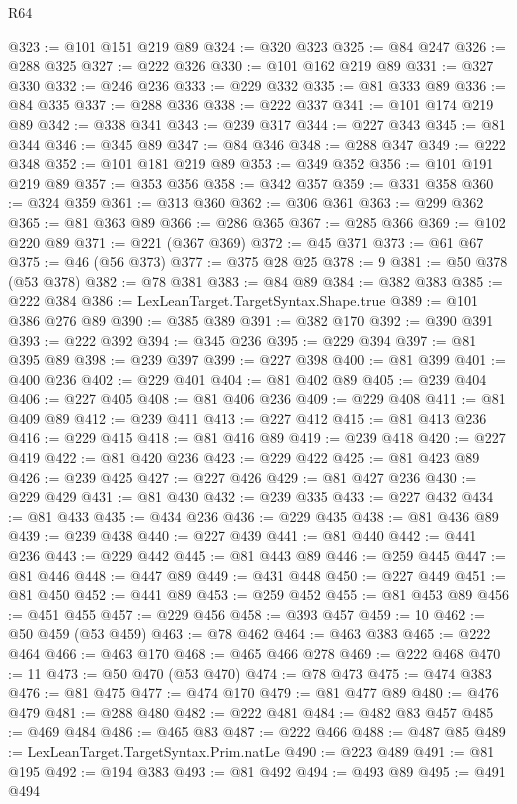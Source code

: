 \begin{lexlean}{R64}
\begin{coremodule}
@323 := @101 @151 @219 @89
@324 := @320 @323
@325 := @84 @247
@326 := @288 @325
@327 := @222 @326
@330 := @101 @162 @219 @89
@331 := @327 @330
@332 := @246 @236
@333 := @229 @332
@335 := @81 @333 @89
@336 := @84 @335
@337 := @288 @336
@338 := @222 @337
@341 := @101 @174 @219 @89
@342 := @338 @341
@343 := @239 @317
@344 := @227 @343
@345 := @81 @344
@346 := @345 @89
@347 := @84 @346
@348 := @288 @347
@349 := @222 @348
@352 := @101 @181 @219 @89
@353 := @349 @352
@356 := @101 @191 @219 @89
@357 := @353 @356
@358 := @342 @357
@359 := @331 @358
@360 := @324 @359
@361 := @313 @360
@362 := @306 @361
@363 := @299 @362
@365 := @81 @363 @89
@366 := @286 @365
@367 := @285 @366
@369 := @102 @220 @89
@371 := @221 (@367 @369)
@372 := @45 @371
@373 := @61 @67
@375 := @46 (@56 @373)
@377 := @375 @28 @25
@378 := 9
@381 := @50 @378 (@53 @378)
@382 := @78 @381
@383 := @84 @89
@384 := @382 @383
@385 := @222 @384
@386 := LexLeanTarget.TargetSyntax.Shape.true
@389 := @101 @386 @276 @89
@390 := @385 @389
@391 := @382 @170
@392 := @390 @391
@393 := @222 @392
@394 := @345 @236
@395 := @229 @394
@397 := @81 @395 @89
@398 := @239 @397
@399 := @227 @398
@400 := @81 @399
@401 := @400 @236
@402 := @229 @401
@404 := @81 @402 @89
@405 := @239 @404
@406 := @227 @405
@408 := @81 @406 @236
@409 := @229 @408
@411 := @81 @409 @89
@412 := @239 @411
@413 := @227 @412
@415 := @81 @413 @236
@416 := @229 @415
@418 := @81 @416 @89
@419 := @239 @418
@420 := @227 @419
@422 := @81 @420 @236
@423 := @229 @422
@425 := @81 @423 @89
@426 := @239 @425
@427 := @227 @426
@429 := @81 @427 @236
@430 := @229 @429
@431 := @81 @430
@432 := @239 @335
@433 := @227 @432
@434 := @81 @433
@435 := @434 @236
@436 := @229 @435
@438 := @81 @436 @89
@439 := @239 @438
@440 := @227 @439
@441 := @81 @440
@442 := @441 @236
@443 := @229 @442
@445 := @81 @443 @89
@446 := @259 @445
@447 := @81 @446
@448 := @447 @89
@449 := @431 @448
@450 := @227 @449
@451 := @81 @450
@452 := @441 @89
@453 := @259 @452
@455 := @81 @453 @89
@456 := @451 @455
@457 := @229 @456
@458 := @393 @457
@459 := 10
@462 := @50 @459 (@53 @459)
@463 := @78 @462
@464 := @463 @383
@465 := @222 @464
@466 := @463 @170
@468 := @465 @466 @278
@469 := @222 @468
@470 := 11
@473 := @50 @470 (@53 @470)
@474 := @78 @473
@475 := @474 @383
@476 := @81 @475
@477 := @474 @170
@479 := @81 @477 @89
@480 := @476 @479
@481 := @288 @480
@482 := @222 @481
@484 := @482 @83 @457
@485 := @469 @484
@486 := @465 @83
@487 := @222 @466
@488 := @487 @85
@489 := LexLeanTarget.TargetSyntax.Prim.natLe
@490 := @223 @489
@491 := @81 @195
@492 := @194 @383
@493 := @81 @492
@494 := @493 @89
@495 := @491 @494

\end{coremodule}
\end{lexlean}
